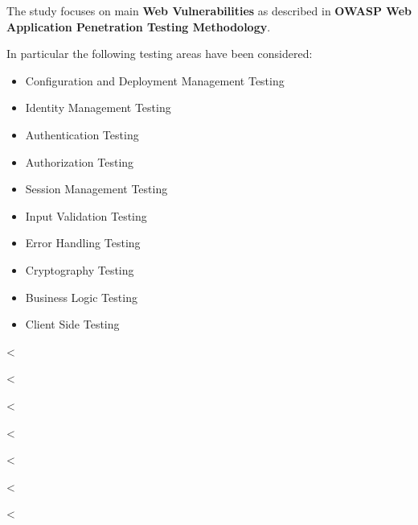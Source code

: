     The study focuses on main \textbf{Web Vulnerabilities} as described in
    \textbf{OWASP Web Application Penetration Testing Methodology}.

    In particular the following testing areas have been considered:

    \begin{itemize}
      \item Configuration and Deployment Management Testing
      \item Identity Management Testing
      \item Authentication Testing
      \item Authorization Testing
      \item Session Management Testing
      \item Input Validation Testing
      \item Error Handling Testing
      \item Cryptography Testing
      \item Business Logic Testing
      \item Client Side Testing
    \end{itemize}

  <%

    <%

  <%

    <%

  <%

    <%


<%
